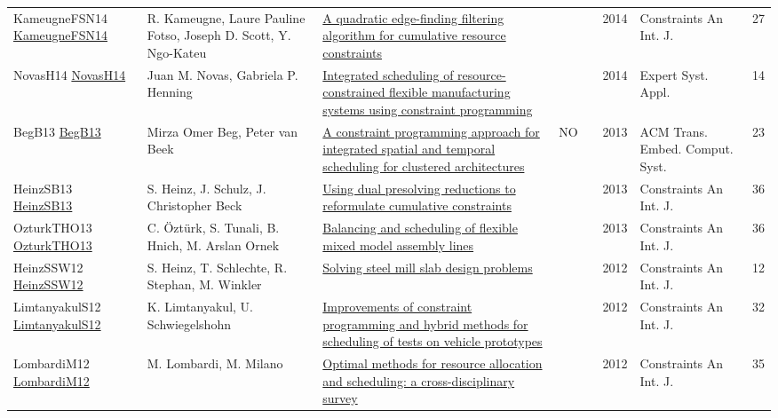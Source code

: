 {\begin{longtable}{p{3cm}p{6cm}p{7cm}rrrp{3cm}r}
KameugneFSN14 \href{https://doi.org/10.1007/s10601-013-9157-z}{KameugneFSN14} & R. Kameugne, Laure Pauline Fotso, Joseph D. Scott, Y. Ngo{-}Kateu & \href{articles/KameugneFSN14.pdf}{A quadratic edge-finding filtering algorithm for cumulative resource constraints} &  & \cite{KameugneFSN14} & 2014 & Constraints An Int. J. & 27\\
NovasH14 \href{https://doi.org/10.1016/j.eswa.2013.09.026}{NovasH14} & Juan M. Novas, Gabriela P. Henning & \href{articles/NovasH14.pdf}{Integrated scheduling of resource-constrained flexible manufacturing systems using constraint programming} &  & \cite{NovasH14} & 2014 & Expert Syst. Appl. & 14\\
BegB13 \href{http://doi.acm.org/10.1145/2512470}{BegB13} & Mirza Omer Beg, Peter van Beek & \href{articles/BegB13.pdf}{A constraint programming approach for integrated spatial and temporal scheduling for clustered architectures} & NO & \cite{BegB13} & 2013 & {ACM} Trans. Embed. Comput. Syst. & 23\\
HeinzSB13 \href{https://doi.org/10.1007/s10601-012-9136-9}{HeinzSB13} & S. Heinz, J. Schulz, J. Christopher Beck & \href{articles/HeinzSB13.pdf}{Using dual presolving reductions to reformulate cumulative constraints} &  & \cite{HeinzSB13} & 2013 & Constraints An Int. J. & 36\\
OzturkTHO13 \href{https://doi.org/10.1007/s10601-013-9142-6}{OzturkTHO13} & C. {\"{O}}zt{\"{u}}rk, S. Tunali, B. Hnich, M. Arslan Ornek & \href{articles/OzturkTHO13.pdf}{Balancing and scheduling of flexible mixed model assembly lines} &  & \cite{OzturkTHO13} & 2013 & Constraints An Int. J. & 36\\
HeinzSSW12 \href{https://doi.org/10.1007/s10601-011-9113-8}{HeinzSSW12} & S. Heinz, T. Schlechte, R. Stephan, M. Winkler & \href{articles/HeinzSSW12.pdf}{Solving steel mill slab design problems} &  & \cite{HeinzSSW12} & 2012 & Constraints An Int. J. & 12\\
LimtanyakulS12 \href{https://doi.org/10.1007/s10601-012-9118-y}{LimtanyakulS12} & K. Limtanyakul, U. Schwiegelshohn & \href{articles/LimtanyakulS12.pdf}{Improvements of constraint programming and hybrid methods for scheduling of tests on vehicle prototypes} &  & \cite{LimtanyakulS12} & 2012 & Constraints An Int. J. & 32\\
LombardiM12 \href{https://doi.org/10.1007/s10601-011-9115-6}{LombardiM12} & M. Lombardi, M. Milano & \href{articles/LombardiM12.pdf}{Optimal methods for resource allocation and scheduling: a cross-disciplinary survey} &  & \cite{LombardiM12} & 2012 & Constraints An Int. J. & 35\\

\end{longtable}}
